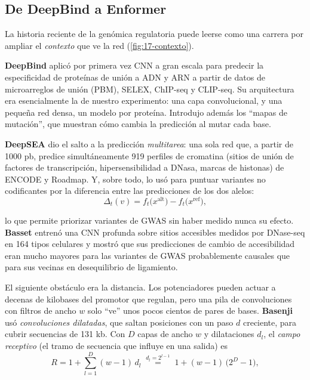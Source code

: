 \subsection{De DeepBind a Enformer}

La historia reciente de la genómica regulatoria puede leerse como una carrera por ampliar el \emph{contexto} que ve la red (\cref{fig:17-contexto}).

\textbf{DeepBind} \parencite{c17-alipanahi2015} aplicó por primera vez CNN a gran escala para predecir la especificidad de proteínas de unión a ADN y ARN a partir de datos de microarreglos de unión (PBM), SELEX, ChIP-seq y CLIP-seq. Su arquitectura era esencialmente la de nuestro experimento: una capa convolucional,  y una pequeña red densa, un modelo por proteína. Introdujo además los ``mapas de mutación'', que muestran cómo cambia la predicción al mutar cada base.

\textbf{DeepSEA} \parencite{c17-zhou2015} dio el salto a la predicción \emph{multitarea}: una sola red que, a partir de 1000 pb, predice simultáneamente 919 perfiles de cromatina (sitios de unión de factores de transcripción, hipersensibilidad a DNasa, marcas de histonas) de ENCODE y Roadmap. Y, sobre todo, lo usó para puntuar variantes no codificantes por la diferencia entre las predicciones de los dos alelos:
\begin{equation}\label{eq:17-deltavar}
\Delta_t(v) = f_t\big(x^{\text{alt}}\big) - f_t\big(x^{\text{ref}}\big),
\end{equation}

\begin{simbolos}
\end{simbolos}

\noindent lo que permite priorizar variantes de GWAS sin haber medido nunca su efecto. \textbf{Basset} \parencite{c17-kelley2016} entrenó una CNN profunda sobre sitios accesibles medidos por DNase-seq en 164 tipos celulares y mostró que sus predicciones de cambio de accesibilidad eran mucho mayores para las variantes de GWAS probablemente causales que para sus vecinas en desequilibrio de ligamiento.

El siguiente obstáculo era la distancia. Los potenciadores pueden actuar a decenas de kilobases del promotor que regulan, pero una pila de convoluciones con filtros de ancho $w$ solo ``ve'' unos pocos cientos de pares de bases. \textbf{Basenji} \parencite{c17-kelley2018} usó \emph{convoluciones dilatadas}, que saltan posiciones con un paso $d$ creciente, para cubrir secuencias de \num{131} kb. Con $D$ capas de ancho $w$ y dilataciones $d_l$, el \emph{campo receptivo} (el tramo de secuencia que influye en una salida) es
\begin{equation}\label{eq:17-campo}
R = 1 + \sum_{l=1}^{D}(w-1)\,d_l \;\overset{d_l=2^{l-1}}{=}\; 1 + (w-1)\,\big(2^{D}-1\big),
\end{equation}

